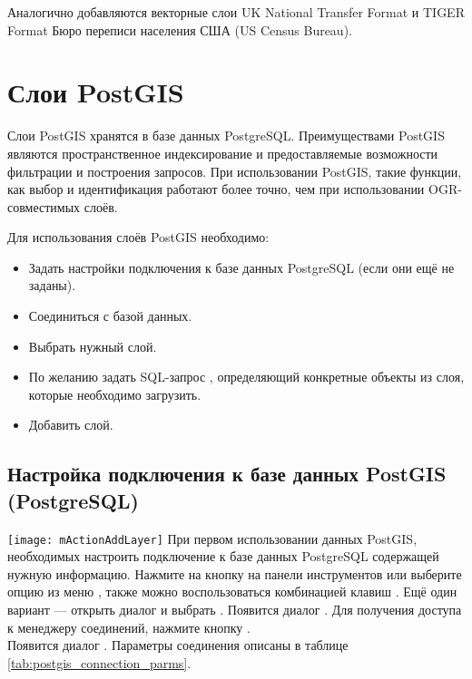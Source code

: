 Аналогично добавляются векторные слои UK National Transfer Format и
TIGER Format Бюро переписи населения США (US Census Bureau).

\section{Слои PostGIS}
\label{label_postgis}

Слои PostGIS хранятся в базе данных PostgreSQL. Преимуществами PostGIS являются
пространственное индексирование и предоставляемые возможности фильтрации и построения запросов. При использовании PostGIS,
такие функции, как выбор и идентификация работают более точно, чем при использовании OGR-совместимых слоёв.

Для использования слоёв PostGIS необходимо:

\begin{itemize}[label=--]
\item Задать настройки подключения \qg к базе данных PostgreSQL (если они ещё не заданы).
\item Соединиться с базой данных.
\item Выбрать нужный слой.
\item По желанию задать SQL-запрос ,
определяющий конкретные объекты из слоя, которые необходимо загрузить.
\item Добавить слой.
\end{itemize}

\subsection{Настройка подключения к базе данных PostGIS (PostgreSQL)}\label{sec:postgis_stored}

\texttt{[image: mActionAddLayer]} При первом использовании данных
PostGIS, необходимых настроить подключение к базе данных PostgreSQL
содержащей нужную информацию. Нажмите на кнопку
 на панели инструментов или выберите опцию
 из меню
, также можно воспользоваться комбинацией клавиш . Ещё один вариант ---
открыть диалог  и выбрать .
Появится диалог . Для получения доступа к менеджеру соединений, нажмите кнопку . \\
Появится диалог . Параметры соединения
описаны в таблице \ref{tab:postgis_connection_parms}.

